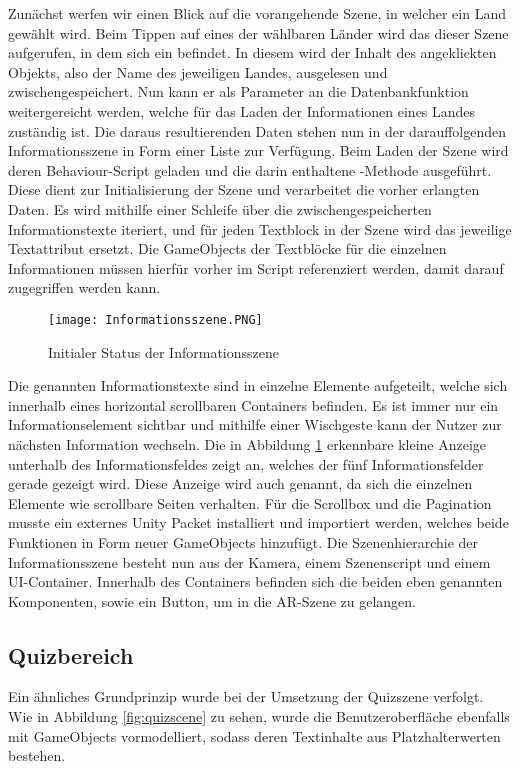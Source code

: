 Zunächst werfen wir einen Blick auf die vorangehende Szene, in welcher ein Land gewählt wird. 
Beim Tippen auf eines der wählbaren Länder wird das  dieser Szene aufgerufen, in dem sich ein  befindet. 
In diesem wird der Inhalt des angeklickten Objekts, also der Name des jeweiligen Landes, ausgelesen und zwischengespeichert. 
Nun kann er als Parameter an die Datenbankfunktion weitergereicht werden, welche für das Laden der Informationen eines Landes zuständig ist. 
Die daraus resultierenden Daten stehen nun in der darauffolgenden Informationsszene in Form einer Liste zur Verfügung.
Beim Laden der Szene wird deren Behaviour-Script geladen und die darin enthaltene -Methode ausgeführt. Diese dient zur Initialisierung der Szene und verarbeitet die vorher erlangten Daten.
Es wird mithilfe einer Schleife über die zwischengespeicherten Informationstexte iteriert, und für jeden Textblock in der Szene wird das jeweilige Textattribut ersetzt.
Die GameObjects der Textblöcke für die einzelnen Informationen müssen hierfür vorher im Script referenziert werden, damit darauf zugegriffen werden kann.

\begin{figure} [h]
\centering
\texttt{[image: Informationsszene.PNG]}
\caption{Initialer Status der Informationsszene}
\label{fig:infoscene}
\end{figure}
Die genannten Informationstexte sind in einzelne Elemente aufgeteilt, welche sich innerhalb eines horizontal scrollbaren Containers befinden. 
Es ist immer nur ein Informationselement sichtbar und mithilfe einer Wischgeste kann der Nutzer zur nächsten Information wechseln.
Die in Abbildung \ref{fig:infoscene} erkennbare kleine Anzeige unterhalb des Informationsfeldes zeigt an, welches der fünf Informationsfelder gerade gezeigt wird.
Diese Anzeige wird auch  genannt, da sich die einzelnen Elemente wie scrollbare Seiten verhalten.
Für die Scrollbox und die Pagination musste ein externes Unity Packet installiert und importiert werden, welches beide Funktionen in Form neuer GameObjects hinzufügt.
Die Szenenhierarchie der Informationsszene besteht nun aus der Kamera, einem Szenenscript und einem UI-Container. 
Innerhalb des Containers befinden sich die beiden eben genannten Komponenten, sowie ein Button, um in die AR-Szene zu gelangen.

\subsection{Quizbereich}
Ein ähnliches Grundprinzip wurde bei der Umsetzung der Quizszene verfolgt.
Wie in Abbildung \ref{fig:quizscene} zu sehen, wurde die Benutzeroberfläche ebenfalls mit GameObjects vormodelliert, sodass deren Textinhalte aus Platzhalterwerten bestehen.

